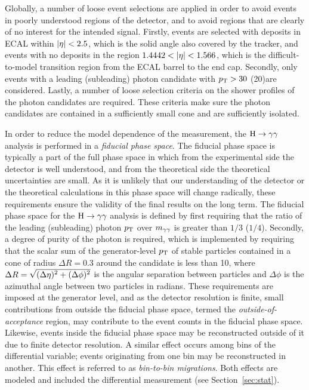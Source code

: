 Globally, a number of loose event selections are applied in order to avoid events in poorly understood regions of the detector, and to avoid regions that are clearly of no interest for the intended signal.
% 
Firstly, events are selected with deposits in ECAL within $\left| \eta \right |<2.5$,
% 
which is the solid angle also covered by the tracker,
% 
and events with no deposits in the region $1.4442 < \left| \eta \right | < 1.566$, which is the difficult-to-model transition region from the ECAL barrel to the end cap.
% 
Secondly, only events with a leading (subleading) photon candidate with $p_\mathrm{T} > 30$ (20)\GeV are considered.
% 
Lastly, a number of loose selection criteria on the shower profiles of the photon candidates are required.
% 
These criteria make sure the photon candidates are contained in a sufficiently small cone and are sufficiently isolated.


In order to reduce the model dependence of the measurement, the $\mathrm{H}\to\mathrm{\gamma}\mathrm{\gamma}$ analysis is performed in a \textit{fiducial phase space}.
% 
The fiducial phase space is typically a part of the full phase space in which from the experimental side the detector is well understood, and from the theoretical side the theoretical uncertainties are small.
% 
As it is unlikely that our understanding of the detector or the theoretical calculations in this phase space will change radically, these requirements ensure the validity of the final results on the long term.
% 
The fiducial phase space for the $\mathrm{H}\to\mathrm{\gamma}\mathrm{\gamma}$ analysis is defined by first requiring that the ratio of the leading (subleading) photon $p_\mathrm{T}$ over $m_{\mathrm{\gamma}\mathrm{\gamma}}$ is greater than $1/3$ ($1/4$).
% 
Secondly, a degree of purity of the photon is required, which is implemented by requiring that the scalar sum of the generator-level $p_\mathrm{T}$ of stable particles contained in a cone of radius $\Delta R=0.3$ around the candidate is less than 10\GeV, where $\Delta R = \sqrt{\smash[b]{(\Delta\eta)^2+(\Delta\phi)^2}}$ is the angular separation between particles and $\Delta\phi$ is the azimuthal angle between two particles in radians.
% 
These requirements are imposed at the generator level, and as the detector resolution is finite, small contributions from outside the fiducial phase space, termed the \textit{outside-of-acceptance} region, may contribute to the event counts in the fiducial phase space.
% 
Likewise, events inside the fiducial phase space may be reconstructed outside of it due to finite detector resolution.
% 
A similar effect occurs among bins of the differential variable; events originating from one bin may be reconstructed in another.
% 
This effect is referred to as \textit{bin-to-bin migrations}.
% 
Both effects are modeled and included the differential measurement (see Section~\ref{sec:stat}).


